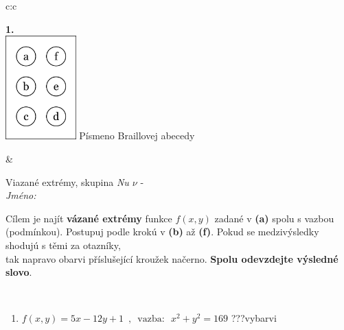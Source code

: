 \documentclass[10pt]{report}
\begin{document}
\begin{tabular}{c:c}
\begin{minipage}[c][104.5mm][t]{0.5\linewidth}
\begin{center}
\begin{minipage}{0.79\linewidth}
\begin{center}
\begin{varwidth}{\linewidth}
\begin{enumerate}
\end{enumerate}
\end{varwidth}
\end{center}
\end{minipage}
\begin{minipage}{0.20\linewidth}
\begin{center}
{\Huge\bfseries 1.} \\[2mm]
\includegraphics[height=40mm]{../images/braille.png}
{\small Písmeno Braillovej abecedy}
\end{center}
\end{minipage}
\end{center}
\end{minipage}
&
\begin{minipage}[c][104.5mm][t]{0.5\linewidth}
\begin{center}
\vspace{7mm}
{\huge Viazané extrémy, skupina \textit{Nu $\nu$} -}\\[5mm]
\textit{Jméno:}\phantom{xxxxxxxxxxxxxxxxxxxxxxxxxxxxxxxxxxxxxxxxxxxxxxxxxxxxxxxxxxxxxxxxx}\\[5mm]
\begin{minipage}{0.95\linewidth}
\begin{center}
Cílem je najít \textbf{vázané extrémy} funkce $f(x,y)$ zadané v \textbf{(a)} spolu s vazbou (podmínkou). Postupuj podle krokú v \textbf{(b)} až \textbf{(f)}. Pokud se medzivýsledky shodujú s těmi za otazníky,\\tak napravo obarvi příslušející kroužek načerno. \textbf{Spolu odevzdejte výsledné slovo}.
\end{center}
\end{minipage}
\\[1mm]
\begin{minipage}{0.79\linewidth}
\begin{center}
\begin{varwidth}{\linewidth}
\begin{enumerate}
\normalsize
\item $f(x,y)=5x-12y+1 \enspace , \enspace \mathrm{vazba:} \enspace x^2+y^2=169$\quad \dotfill\; ???\;\dotfill \quad vybarvi

\end{enumerate}
\end{varwidth}
\end{center}
\end{minipage}
\end{center}
\end{minipage}
\end{tabular}
\end{document}
